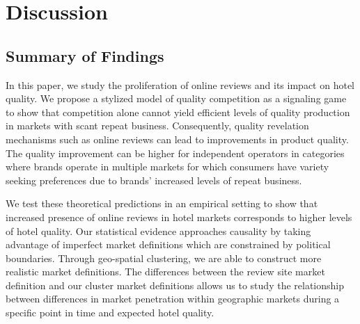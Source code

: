 \documentclass[mksc,blindrev]{informs3} %
\begin{document}







\section{Discussion} \label{sec:discussion}

\subsection{Summary of Findings}

In this paper, we study the proliferation of online reviews and its impact on hotel quality. We propose a stylized model of quality competition as a signaling game to show that competition alone cannot yield efficient levels of quality production in markets with scant repeat business. Consequently, quality revelation mechanisms such as online reviews can lead to improvements in product quality. The quality improvement can be higher for independent operators in categories where brands operate in multiple markets for which consumers have variety seeking preferences due to brands' increased levels of repeat business. 

We test these theoretical predictions in an empirical setting to show that increased presence of online reviews in hotel markets corresponds to higher levels of hotel quality. Our statistical evidence approaches causality by taking advantage of imperfect market definitions which are constrained by political boundaries. Through geo-spatial clustering, we are able to construct more realistic market definitions. The differences between the review site market definition and our cluster market definitions allows us to study the relationship between differences in market penetration within geographic markets during a specific point in time and expected hotel quality. 
\end{document}
